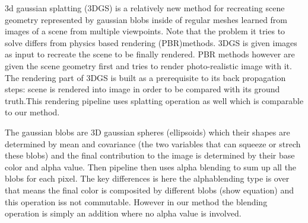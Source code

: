 3d gaussian splatting (3DGS) is a relatively new method for recreating scene geometry represented by gaussian blobs inside of regular meshes learned from images of a scene from multiple viewpoints. Note that the problem it tries to solve differs from physics based rendering (PBR)methods. 3DGS is given images as input to recreate the scene to be finally rendered. PBR methods however are given the scene geometry first and tries to render photo-realistic image with it. The rendering part of 3DGS is built as a prerequisite to its back propagation steps: scene is rendered into image in order to be compared with its ground truth.This rendering pipeline uses splatting operation as well which is comparable to our method. 

The gaussian blobs are 3D gaussian spheres (ellipsoids) which their shapes are determined by mean and covariance (the two variables that can squeeze or strech these blobs) and the final contribution to the image is determined by their base color and alpha value. Then pipeline then uses alpha blending to sum up all the blobs for each pixel. The key differences is here the alphablending type is over that means the final color is composited by different blobs (show equation) and this operation iss not commutable. However in our method the blending operation is simply an addition where no alpha value is involved.
